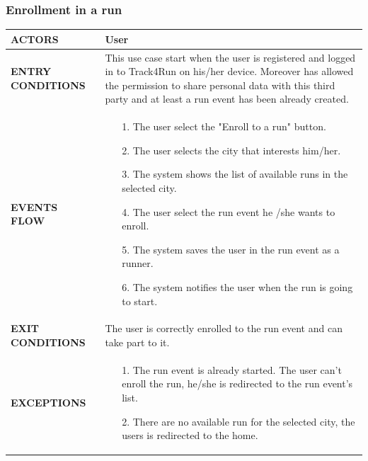 \documentclass[a4paper]{article}
\begin{document}
\subsubsection{Enrollment in a run}
\begin{center}
    \begin{tabular}{l || p{8cm} ||}
        \bf{ACTORS} & User \\ \hline
        \bf{ENTRY CONDITIONS} & This use case start when the user is registered and logged in to Track4Run on his/her device. Moreover has allowed the permission to share personal data with this third party and at least a run event has been already created. \\ \hline
        \bf{EVENTS FLOW} & \begin{itemize}[noitemsep, topsep=0cm, leftmargin=*] \vspace{-0.2cm}
            \item[1.] The user select the "Enroll to a run" button.
            \item[2.] The user selects the city that interests him/her.
            \item[3.] The system shows the list of available runs in the selected city.
            \item[4.] The user select the run event he /she wants to enroll.
            \item[5.] The system saves the user in the run event as a runner.
            \item[6.] The system notifies the user when the run is going to start.
        \end{itemize}
        \\ \hline
        \bf{EXIT CONDITIONS} & The user is correctly enrolled to the run event and can take part to it. \\ \hline
        \bf{EXCEPTIONS} & \begin{itemize}[noitemsep, topsep=0cm, leftmargin=*] \vspace{-0.2cm}
            \item[1.] The run event is already started. The user can't enroll the run, he/she is redirected to the run event's list.
            \item[2.] There are no available run for the selected city, the users is redirected to the home.
        \end{itemize}
        \\ \hline \hline
    \end{tabular}
\end{center}
\end{document}
